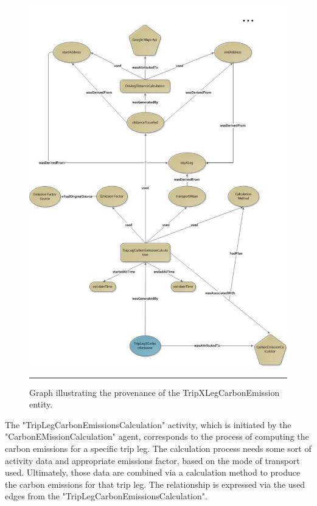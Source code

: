 \begin{figure}[htbp]
	\centering
		\includegraphics[scale=0.40]{./Figures/chapter3/figure2.pdf}
		\rule{35em}{0.5pt}
	\caption[Graph illustrating the provenance of the TripXLegCarbonEmission entity]{Graph illustrating the provenance of the TripXLegCarbonEmission entity.}
	\label{fig:provTripLegCo2Graph}
\end{figure}

The "TripLegCarbonEmissionsCalculation" activity, which is initiated by the "CarbonEMissionCalculation" agent, corresponds to the process of computing the carbon emissions for a specific trip leg.  The calculation process needs some sort of activity data and appropriate emissions factor, based on the mode of transport used. Ultimately, those data are combined via a calculation method to produce the carbon emissions for that trip leg. The relationship is expressed via the used edges from the "TripLegCarbonEmissionsCalculation".

